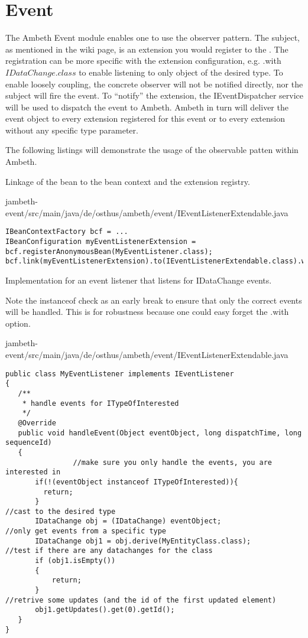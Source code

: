\section{Event}
\label{module:Event}
\ClearAPI
\TODO
The Ambeth Event module enables one to use the observer pattern\cite{obs15}. 
The subject, as mentioned in the wiki page, is an extension you would register to the . The registration can be more specific with the extension configuration, e.g. .with\(IDataChange.class\) to enable listening to only object of the desired type.
To enable loosely coupling, the concrete observer will not be notified directly, nor the subject will fire the event. To ``notify'' the extension, the IEventDispatcher service will be used to dispatch the event to Ambeth. Ambeth in turn will deliver the event object to every extension registered for this event or to every extension without any specific type parameter.

The following listings will demonstrate the usage of the observable patten within Ambeth.

Linkage of the bean to the bean context and the extension registry.

{jambeth-event/src/main/java/de/osthus/ambeth/event/IEventListenerExtendable.java}
\begin{lstlisting}[style=Java,caption={Example registration of an EventListener}]
IBeanContextFactory bcf = ...
IBeanConfiguration myEventListenerExtension = bcf.registerAnonymousBean(MyEventListener.class);
bcf.link(myEventListenerExtension).to(IEventListenerExtendable.class).with(IDataChange.class);
\end{lstlisting}

Implementation for an event listener that listens for IDataChange events.

Note the instanceof check as an early break to ensure that only the correct events will be handled. This is for robustness because one could easy forget the .with\(\) option.

{jambeth-event/src/main/java/de/osthus/ambeth/event/IEventListenerExtendable.java}
\begin{lstlisting}[style=Java,caption={}]
public class MyEventListener implements IEventListener
{
   /**
    * handle events for ITypeOfInterested
    */
   @Override
   public void handleEvent(Object eventObject, long dispatchTime, long sequenceId)
   {
				//make sure you only handle the events, you are interested in
       if(!(eventObject instanceof ITypeOfInterested)){
         return;
       }
//cast to the desired type
       IDataChange obj = (IDataChange) eventObject;
//only get events from a specific type
       IDataChange obj1 = obj.derive(MyEntityClass.class);
//test if there are any datachanges for the class
       if (obj1.isEmpty())
       {
           return;
       }
//retrive some updates (and the id of the first updated element)
       obj1.getUpdates().get(0).getId();
   }
}
\end{lstlisting}

